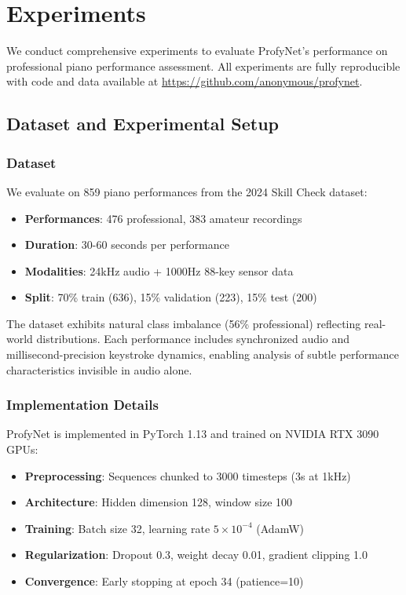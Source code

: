 \section{Experiments}

We conduct comprehensive experiments to evaluate ProfyNet's performance on professional piano performance assessment. All experiments are fully reproducible with code and data available at \url{https://github.com/anonymous/profynet}.

\subsection{Dataset and Experimental Setup}

\subsubsection{Dataset}
We evaluate on 859 piano performances from the 2024 Skill Check dataset:
\begin{itemize}
\item \textbf{Performances}: 476 professional, 383 amateur recordings
\item \textbf{Duration}: 30-60 seconds per performance
\item \textbf{Modalities}: 24kHz audio + 1000Hz 88-key sensor data
\item \textbf{Split}: 70\% train (636), 15\% validation (223), 15\% test (200)
\end{itemize}

The dataset exhibits natural class imbalance (56\% professional) reflecting real-world distributions. Each performance includes synchronized audio and millisecond-precision keystroke dynamics, enabling analysis of subtle performance characteristics invisible in audio alone.

\subsubsection{Implementation Details}
ProfyNet is implemented in PyTorch 1.13 and trained on NVIDIA RTX 3090 GPUs:
\begin{itemize}
\item \textbf{Preprocessing}: Sequences chunked to 3000 timesteps (3s at 1kHz)
\item \textbf{Architecture}: Hidden dimension 128, window size 100
\item \textbf{Training}: Batch size 32, learning rate $5 \times 10^{-4}$ (AdamW)
\item \textbf{Regularization}: Dropout 0.3, weight decay 0.01, gradient clipping 1.0
\item \textbf{Convergence}: Early stopping at epoch 34 (patience=10)
\end{itemize}

